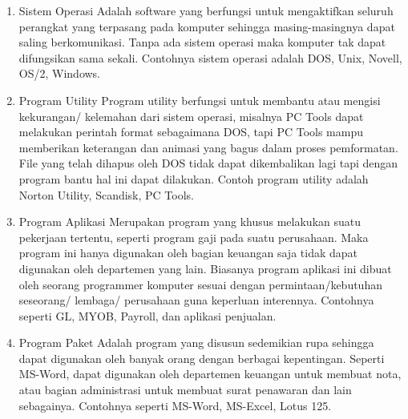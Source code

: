 \documentclass{article}
\begin{document}
\begin{enumerate}
    \item Sistem Operasi \newline
    Adalah software yang berfungsi untuk mengaktifkan seluruh perangkat yang terpasang pada komputer sehingga masing-masingnya dapat saling berkomunikasi. Tanpa ada sistem operasi maka komputer tak dapat difungsikan sama sekali. Contohnya sistem operasi adalah  DOS, Unix, Novell, OS/2, Windows.
    \item Program Utility \newline
    Program utility berfungsi untuk membantu atau mengisi kekurangan/ kelemahan dari sistem operasi, misalnya PC Tools dapat melakukan perintah format sebagaimana DOS, tapi PC Tools mampu memberikan keterangan dan animasi yang bagus dalam proses pemformatan. File yang telah dihapus oleh DOS tidak dapat dikembalikan lagi tapi dengan program bantu hal ini dapat dilakukan. Contoh program utility adalah Norton Utility, Scandisk, PC Tools.
    \item Program Aplikasi \newline
    Merupakan program yang khusus melakukan suatu pekerjaan tertentu, seperti program gaji pada suatu perusahaan. Maka program ini hanya digunakan oleh bagian keuangan saja tidak dapat digunakan oleh departemen yang lain. Biasanya program aplikasi ini dibuat oleh seorang programmer komputer sesuai dengan permintaan/kebutuhan seseorang/ lembaga/ perusahaan guna keperluan interennya. Contohnya  seperti GL, MYOB, Payroll, dan aplikasi penjualan.
    \item Program Paket \newline
    Adalah program yang disusun sedemikian rupa sehingga dapat digunakan oleh banyak orang dengan berbagai kepentingan. Seperti MS-Word, dapat digunakan oleh departemen keuangan untuk membuat nota, atau bagian administrasi untuk membuat surat penawaran dan lain sebagainya. Contohnya seperti MS-Word, MS-Excel, Lotus 125.
    

\end{enumerate}
\end{document}
